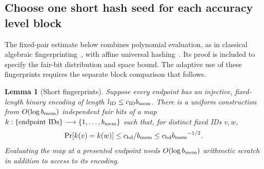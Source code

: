\documentclass[11pt]{article}
\numberwithin{equation}{section}
\newtheorem{lemma}[theorem]{Lemma}
\theoremstyle{definition}
\theoremstyle{remark}
\begin{document}
\subsection{Choose one short hash seed for each accuracy level block}

The fixed-pair estimate below combines polynomial evaluation, as in
classical algebraic fingerprinting~\cite{Schwartz1980}, with affine
universal hashing~\cite{CarterWegman1979}. Its proof is included to
specify the fair-bit distribution and space bound. The adaptive use of
these fingerprints requires the separate block comparison that follows.

\begin{lemma}[Short fingerprints]\label{lem:fp-hash}
Suppose every endpoint has an injective, fixed-length binary encoding of
length ${l_{\rm ID}}\le c_{\mathrm{ID}}{b_{\rm mem}}$.  There is a uniform construction from
$O(\log {b_{\rm mem}})$ independent fair bits of a map
$k:\{\text{endpoint IDs}\}\longrightarrow\{1,\ldots,{b_{\rm mem}}\}$ such that, for
distinct fixed IDs $v,w$,
\begin{equation}
 \Pr[k(v)=k(w)]\le {c_{\rm bd}}/{b_{\rm mem}}\le {c_{\rm bd}} {b_{\rm mem}}^{-1/2}.
 \label{eq:fp-pair-collision}
\end{equation}
Evaluating the map at a presented endpoint needs $O(\log {b_{\rm mem}})$ arithmetic
scratch in addition to access to its encoding.
\end{lemma}
\end{document}
